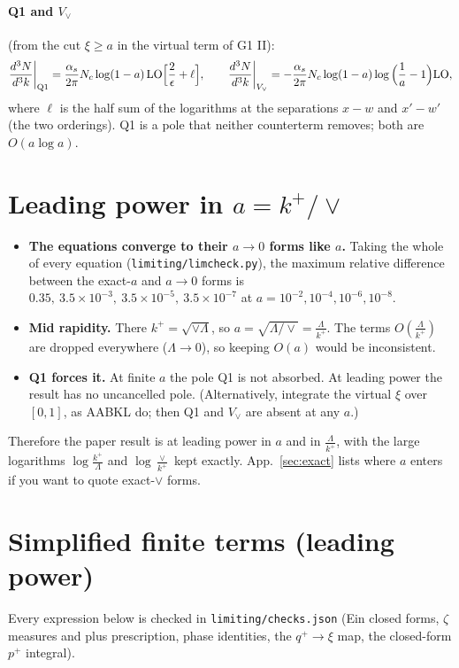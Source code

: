 \documentclass[10pt]{article}
\numberwithin{equation}{section}
\newcommand{\LO}{{\rm LO}}
\begin{document}
\paragraph{Q1 and $V_\vee$} (from the cut $\xi\ge a$ in the virtual term of G1 II):
\begin{equation}
\frac{d^3N}{d^3k}\bigg|_{\rm Q1}=\frac{\alpha_s}{2\pi}N_c\log(1-a)\,\LO\Big[\frac2\epsilon+\ell\Big],\qquad
\frac{d^3N}{d^3k}\bigg|_{V_\vee}=-\frac{\alpha_s}{2\pi}N_c\log(1-a)\log\Big(\frac1a-1\Big)\LO,
\end{equation}
where $\ell$ is the half sum of the logarithms at the separations $x-w$ and $x'-w'$ (the two orderings). Q1 is a pole that neither counterterm removes; both are $O(a\log a)$.

\section{Leading power in \texorpdfstring{$a=k^+/\vee$}{a=k+/vee}}\label{sec:lp}
\begin{itemize}
\item \textbf{The equations converge to their $a\to0$ forms like $a$.} Taking the whole of every equation (\texttt{limiting/limcheck.py}), the maximum relative difference between the exact-$a$ and $a\to0$ forms is $0.35,\ 3.5\times10^{-3},\ 3.5\times10^{-5},\ 3.5\times10^{-7}$ at $a=10^{-2},10^{-4},10^{-6},10^{-8}$.
\item \textbf{Mid rapidity.} There $k^+=\sqrt{\vee\Lambda}$, so $a=\sqrt{\Lambda/\vee}=\frac{\Lambda}{k^+}$. The terms $O(\frac{\Lambda}{k^+})$ are dropped everywhere ($\Lambda\to0$), so keeping $O(a)$ would be inconsistent.
\item \textbf{Q1 forces it.} At finite $a$ the pole Q1 is not absorbed. At leading power the result has no uncancelled pole. (Alternatively, integrate the virtual $\xi$ over $[0,1]$, as AABKL do; then Q1 and $V_\vee$ are absent at any $a$.)
\end{itemize}
Therefore the paper result is at leading power in $a$ and in $\frac{\Lambda}{k^+}$, with the large logarithms $\log\frac{k^+}{\Lambda}$ and $\log\frac{\vee}{k^+}$ kept exactly. App.~\ref{sec:exact} lists where $a$ enters if you want to quote exact-$\vee$ forms.

\section{Simplified finite terms (leading power)}\label{sec:simp}
Every expression below is checked in \texttt{limiting/checks.json} (Ein closed forms, $\zeta$ measures and plus prescription, phase identities, the $q^+\to\xi$ map, the closed-form $p^+$ integral).
\end{document}
